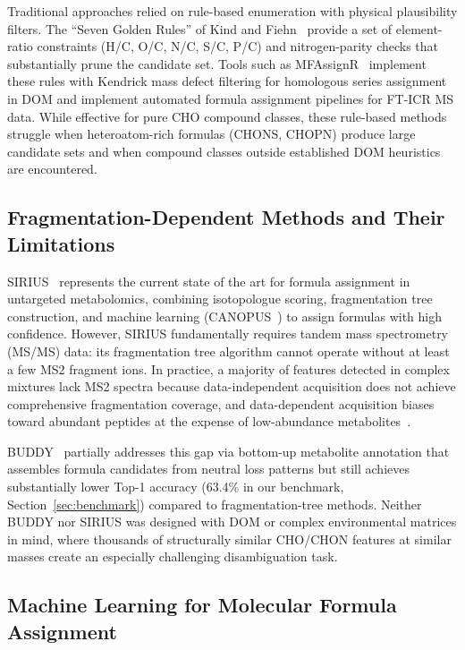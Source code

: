 \documentclass[journal=jcisd8]{achemso}
\begin{document}
Traditional approaches relied on rule-based enumeration with physical plausibility filters.
The ``Seven Golden Rules'' of Kind and Fiehn~\cite{Kind2007} provide a set of element-ratio
constraints (H/C, O/C, N/C, S/C, P/C) and nitrogen-parity checks that substantially prune
the candidate set.  Tools such as MFAssignR~\cite{Tolić2017} implement these rules with
Kendrick mass defect filtering for homologous series assignment in DOM and implement automated
formula assignment pipelines for FT-ICR MS data.  While effective for pure CHO compound
classes, these rule-based methods struggle when heteroatom-rich formulas (CHONS, CHOPN)
produce large candidate sets and when compound classes outside established DOM heuristics
are encountered.

\subsection{Fragmentation-Dependent Methods and Their Limitations}

SIRIUS~\cite{Duehrkop2019,Duehrkop2015} represents the current state of the art for formula
assignment in untargeted metabolomics, combining isotopologue scoring, fragmentation tree
construction, and machine learning (CANOPUS~\cite{Dührkop2021}) to assign formulas with high
confidence.  However, SIRIUS fundamentally requires tandem mass spectrometry (MS/MS) data:
its fragmentation tree algorithm cannot operate without at least a few MS2 fragment ions.
In practice, a majority of features detected in complex mixtures lack MS2 spectra because
data-independent acquisition does not achieve comprehensive fragmentation coverage, and
data-dependent acquisition biases toward abundant peptides at the expense of low-abundance
metabolites~\cite{Aron2020}.

BUDDY~\cite{Guo2023} partially addresses this gap via bottom-up metabolite annotation that
assembles formula candidates from neutral loss patterns but still achieves substantially lower
Top-1 accuracy (63.4\% in our benchmark, Section~\ref{sec:benchmark}) compared to
fragmentation-tree methods.  Neither BUDDY nor SIRIUS was designed with DOM or complex
environmental matrices in mind, where thousands of structurally similar CHO/CHON features
at similar masses create an especially challenging disambiguation task.

\subsection{Machine Learning for Molecular Formula Assignment}
\end{document}
